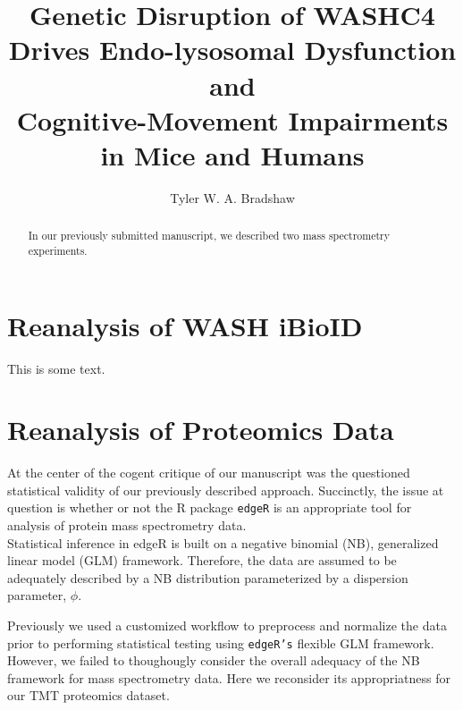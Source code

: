 \documentclass[11pt]{elife}\usepackage[]{graphicx}\usepackage[]{color}
\title{Genetic Disruption of WASHC4 Drives Endo-lysosomal Dysfunction and \\
Cognitive-Movement Impairments in Mice and Humans}
\author[1]{Tyler W. A. Bradshaw}
\affil[1]{Duke University, Department of Neurobiology, Durham, NC USA}
\begin{document}
\setlength{\abovedisplayskip}{3pt}
\setlength{\belowdisplayskip}{3pt}

\maketitle

\begin{abstract}

In our previously submitted manuscript, we described two mass spectrometry 
experiments.

\end{abstract}

\newpage

\begin{fullwidth}

\section{Reanalysis of WASH iBioID}
This is some text.

\section{Reanalysis of Proteomics Data}

At the center of the cogent critique of our manuscript 
was the questioned statistical validity of our previously described approach.   
Succinctly, the issue at question is whether or not the R package \texttt{edgeR}
is an appropriate tool for analysis of protein mass spectrometry data.\\

Statistical inference in edgeR is built on a 
negative binomial (NB), generalized linear model (GLM) framework. 
Therefore, the data are assumed to be adequately described by a NB distribution 
parameterized by a dispersion parameter, $\phi$. \footnotemark{} \\



Previously we used a customized workflow \footnotemark{} to preprocess
and normalize the data prior to performing statistical testing using
\texttt{edgeR's} flexible GLM framework. However, we failed to thoughougly
consider the overall adequacy of the NB framework for mass spectrometry data. 
Here we reconsider its appropriatness for our TMT proteomics dataset.  \\


\end{fullwidth}
\end{document}
